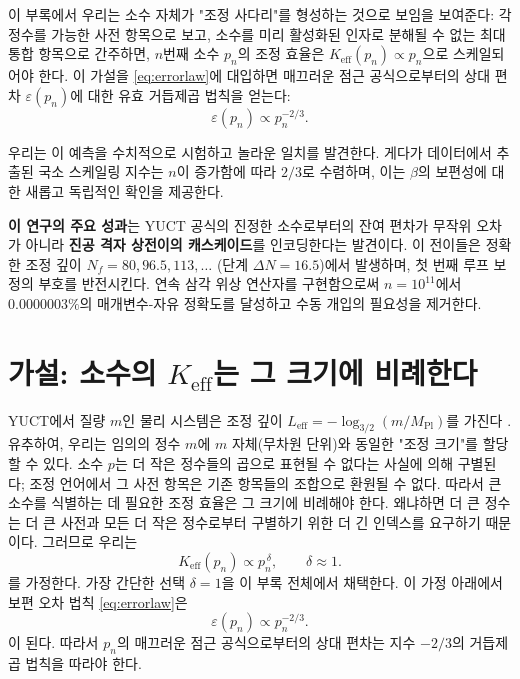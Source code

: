 \documentclass[11pt,a4paper]{article}
\begin{document}
	이 부록에서 우리는 소수 자체가 "조정 사다리"를 형성하는 것으로 보임을 보여준다: 각 정수를 가능한 사전 항목으로 보고, 소수를 미리 활성화된 인자로 분해될 수 없는 최대 통합 항목으로 간주하면, \(n\)번째 소수 \(p_n\)의 조정 효율은 \(K_{\mathrm{eff}}(p_n) \propto p_n\)으로 스케일되어야 한다. 이 가설을 \eqref{eq:errorlaw}에 대입하면 매끄러운 점근 공식으로부터의 상대 편차 \(\varepsilon(p_n)\)에 대한 유효 거듭제곱 법칙을 얻는다:
	\[
	\varepsilon(p_n) \propto p_n^{-2/3}.
	\]
	
	우리는 이 예측을 수치적으로 시험하고 놀라운 일치를 발견한다. 게다가 데이터에서 추출된 국소 스케일링 지수는 \(n\)이 증가함에 따라 \(2/3\)로 수렴하며, 이는 \(\beta\)의 보편성에 대한 새롭고 독립적인 확인을 제공한다.
	
	\textbf{이 연구의 주요 성과}는 YUCT 공식의 진정한 소수로부터의 잔여 편차가 무작위 오차가 아니라 \textbf{진공 격자 상전이의 캐스케이드}를 인코딩한다는 발견이다. 이 전이들은 정확한 조정 깊이 \(N_f = 80, 96.5, 113, \dots\) (단계 \(\Delta N = 16.5\))에서 발생하며, 첫 번째 루프 보정의 부호를 반전시킨다. 연속 삼각 위상 연산자를 구현함으로써 \(n=10^{11}\)에서 \(0.0000003\%\)의 매개변수-자유 정확도를 달성하고 수동 개입의 필요성을 제거한다.
	
	\section{가설: 소수의 \(K_{\mathrm{eff}}\)는 그 크기에 비례한다}
	YUCT에서 질량 \(m\)인 물리 시스템은 조정 깊이 \(L_{\mathrm{eff}} = -\log_{3/2}(m/M_{\mathrm{Pl}})\)를 가진다 \cite{YakushevLaw2026}. 유추하여, 우리는 임의의 정수 \(m\)에 \(m\) 자체(무차원 단위)와 동일한 "조정 크기"를 할당할 수 있다. 소수 \(p\)는 더 작은 정수들의 곱으로 표현될 수 없다는 사실에 의해 구별된다; 조정 언어에서 그 사전 항목은 기존 항목들의 조합으로 환원될 수 없다. 따라서 큰 소수를 식별하는 데 필요한 조정 효율은 그 크기에 비례해야 한다. 왜냐하면 더 큰 정수는 더 큰 사전과 모든 더 작은 정수로부터 구별하기 위한 더 긴 인덱스를 요구하기 때문이다. 그러므로 우리는
	\begin{equation}\label{eq:Keff-prime}
		K_{\mathrm{eff}}(p_n) \propto p_n^{\,\delta}, \qquad \delta \approx 1.
	\end{equation}
	를 가정한다. 가장 간단한 선택 \(\delta = 1\)을 이 부록 전체에서 채택한다. 이 가정 아래에서 보편 오차 법칙 \eqref{eq:errorlaw}은
	\begin{equation}\label{eq:error-prime}
		\varepsilon(p_n) \propto p_n^{-2/3}.
	\end{equation}
	이 된다. 따라서 \(p_n\)의 매끄러운 점근 공식으로부터의 상대 편차는 지수 \(-2/3\)의 거듭제곱 법칙을 따라야 한다.
	
\end{document}

